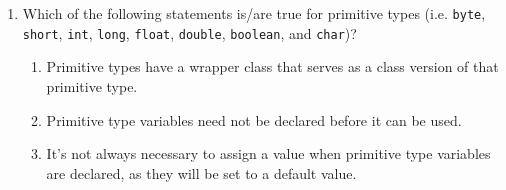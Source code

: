 \documentclass[CS180-S16-FinalExam.tex]{subfiles}
\begin{document}
\begin{enumerate}








\item  Which of the following statements is/are true for primitive types (i.e. \texttt{byte}, \texttt{short}, \texttt{int}, \texttt{long}, \texttt{float}, \texttt{double}, \texttt{boolean}, and \texttt{char})?
\begin{enumerate}[I]
\item Primitive types have a wrapper class that serves as a class version of that primitive type.
\item Primitive type variables need not be declared before it can be used. 
\item It's not always necessary to assign a value when primitive type variables are declared, as they will be set to a default value. 
\end{enumerate}


\end{enumerate}
\end{document}
